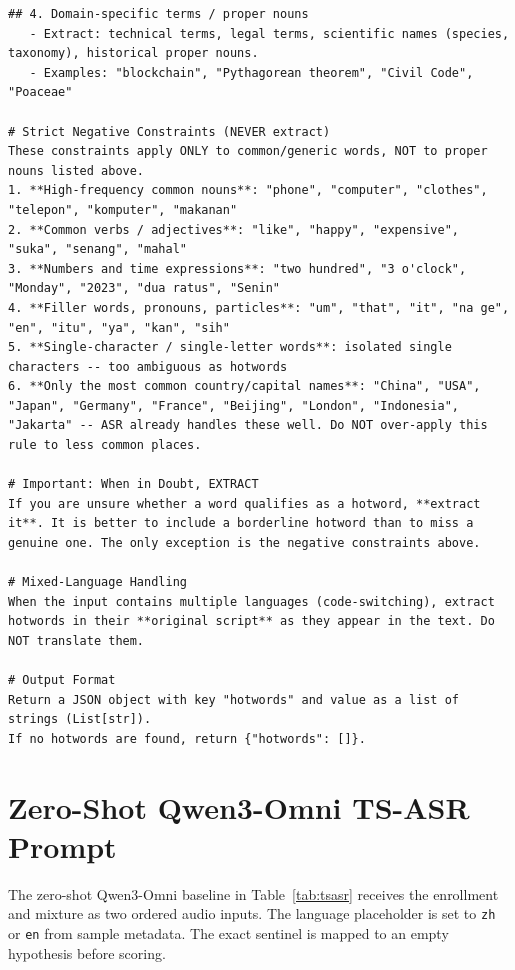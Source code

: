 \begin{lstlisting}[style=plain,
    caption={Hotword extraction prompt used to annotate training and
    evaluation hotword pools.},
    label={lst:hotword-prompt}]
## 4. Domain-specific terms / proper nouns
   - Extract: technical terms, legal terms, scientific names (species, taxonomy), historical proper nouns.
   - Examples: "blockchain", "Pythagorean theorem", "Civil Code", "Poaceae"

# Strict Negative Constraints (NEVER extract)
These constraints apply ONLY to common/generic words, NOT to proper nouns listed above.
1. **High-frequency common nouns**: "phone", "computer", "clothes", "telepon", "komputer", "makanan"
2. **Common verbs / adjectives**: "like", "happy", "expensive", "suka", "senang", "mahal"
3. **Numbers and time expressions**: "two hundred", "3 o'clock", "Monday", "2023", "dua ratus", "Senin"
4. **Filler words, pronouns, particles**: "um", "that", "it", "na ge", "en", "itu", "ya", "kan", "sih"
5. **Single-character / single-letter words**: isolated single characters -- too ambiguous as hotwords
6. **Only the most common country/capital names**: "China", "USA", "Japan", "Germany", "France", "Beijing", "London", "Indonesia", "Jakarta" -- ASR already handles these well. Do NOT over-apply this rule to less common places.

# Important: When in Doubt, EXTRACT
If you are unsure whether a word qualifies as a hotword, **extract it**. It is better to include a borderline hotword than to miss a genuine one. The only exception is the negative constraints above.

# Mixed-Language Handling
When the input contains multiple languages (code-switching), extract hotwords in their **original script** as they appear in the text. Do NOT translate them.

# Output Format
Return a JSON object with key "hotwords" and value as a list of strings (List[str]).
If no hotwords are found, return {"hotwords": []}.
\end{lstlisting}

\section{Zero-Shot Qwen3-Omni TS-ASR Prompt}
\label{sec:appendix-qwen3-omni-tsasr-prompt}

The zero-shot Qwen3-Omni baseline in Table~\ref{tab:tsasr} receives
the enrollment and mixture as two ordered audio inputs. The language
placeholder is set to \texttt{zh} or \texttt{en} from sample metadata.
The exact sentinel is mapped to an empty hypothesis before scoring.

